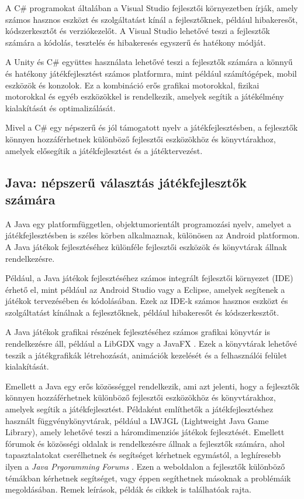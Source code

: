 A C\# programokat általában a Visual Studio\cite{vs} fejlesztői környezetben írják, amely számos hasznos eszközt és szolgáltatást kínál a fejlesztőknek, például hibakeresőt, kódszerkesztőt és verziókezelőt. A Visual Studio lehetővé teszi a fejlesztők számára a kódolás, tesztelés és hibakeresés egyszerű és hatékony módját.

A Unity és C\# együttes használata lehetővé teszi a fejlesztők számára a könnyű és hatékony játékfejlesztést számos platformra, mint például számítógépek, mobil eszközök és konzolok. Ez a kombináció erős grafikai motorokkal, fizikai motorokkal és egyéb eszközökkel is rendelkezik, amelyek segítik a játékélmény kialakítását és optimalizálását.

Mivel a C\# egy népszerű és jól támogatott nyelv a játékfejlesztésben, a fejlesztők könnyen hozzáférhetnek különböző fejlesztői eszközökhöz és könyvtárakhoz, amelyek elősegítik a játékfejlesztést és a játéktervezést.

\subsection{Java: népszerű választás játékfejlesztők számára}
 A Java \cite{java-doc, java} egy platformfüggetlen, objektumorientált programozási nyelv, amelyet a játékfejlesztésben is széles körben alkalmaznak, különösen az Android platformon. A Java játékok fejlesztéséhez különféle fejlesztői eszközök és könyvtárak állnak rendelkezésre.

Például, a Java játékok fejlesztéséhez számos integrált fejlesztői környezet (IDE) érhető el, mint például az Android Studio vagy a Eclipse, amelyek segítenek a játékok tervezésében és kódolásában. Ezek az IDE-k számos hasznos eszközt és szolgáltatást kínálnak a fejlesztőknek, például hibakeresőt és kódszerkesztőt.

A Java játékok grafikai részének fejlesztéséhez számos grafikai könyvtár is rendelkezésre áll, például a LibGDX \cite{libgdx} vagy a JavaFX \cite{javafx}. Ezek a könyvtárak lehetővé teszik a játékgrafikák létrehozását, animációk kezelését és a felhasználói felület kialakítását.

Emellett a Java egy erős közösséggel rendelkezik, ami azt jelenti, hogy a fejlesztők könnyen hozzáférhetnek különböző fejlesztői eszközökhöz és könyvtárakhoz, amelyek segítik a játékfejlesztést. Példaként említhetők a játékfejlesztéshez használt függvénykönyvtárak, például a LWJGL (Lightweight Java Game Library), amely lehetővé teszi a háromdimenziós játékok fejlesztését. Emellett fórumok és közösségi oldalak is rendelkezésre állnak a fejlesztők számára, ahol tapasztalatokat cserélhetnek és segítséget kérhetnek egymástól, a leghíresebb ilyen a \textsl{Java Prgoramming Forums} \cite{JPF}. Ezen a weboldalon a fejlesztők különböző témákban kérhetnek segítséget, vagy éppen segíthetnek másoknak a problémáik megoldásában. Remek leírások, példák és cikkek is találhatóak rajta.

